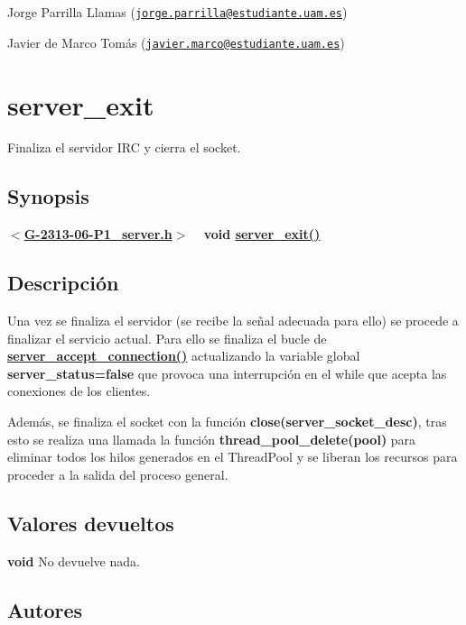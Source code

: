 \begin{DoxyItemize}
\item Jorge Parrilla Llamas (\href{mailto:jorge.parrilla@estudiante.uam.es}{\tt jorge.\+parrilla@estudiante.\+uam.\+es}) 
\item Javier de Marco Tomás (\href{mailto:javier.marco@estudiante.uam.es}{\tt javier.\+marco@estudiante.\+uam.\+es}) 
\end{DoxyItemize}\hypertarget{server_exit}{}\section{server\+\_\+exit}\label{server_exit}
Finaliza el servidor I\+R\+C y cierra el socket.\hypertarget{server_exit_synopsis6}{}\subsection{Synopsis}\label{server_exit_synopsis6}
{ {\bfseries $<$\hyperlink{G-2313-06-P1__server_8h}{G-\/2313-\/06-\/\+P1\+\_\+server.\+h}$>$} ~\newline
 {\bfseries void \hyperlink{G-2313-06-P1__server_8c_a0e947005d451a8f3bf3af01f54b59f11}{server\+\_\+exit()}} } \hypertarget{server_exit_descripcion6}{}\subsection{Descripción}\label{server_exit_descripcion6}
Una vez se finaliza el servidor (se recibe la señal adecuada para ello) se procede a finalizar el servicio actual. Para ello se finaliza el bucle de {\bfseries \hyperlink{G-2313-06-P1__server_8c_aaac8642d2e699e0f9d942d28a9b233c2}{server\+\_\+accept\+\_\+connection()}} actualizando la variable global {\bfseries server\+\_\+status=false} que provoca una interrupción en el while que acepta las conexiones de los clientes.

Además, se finaliza el socket con la función {\bfseries close(server\+\_\+socket\+\_\+desc)}, tras esto se realiza una llamada la función {\bfseries thread\+\_\+pool\+\_\+delete(pool)} para eliminar todos los hilos generados en el Thread\+Pool y se liberan los recursos para proceder a la salida del proceso general.\hypertarget{server_exit_return6}{}\subsection{Valores devueltos}\label{server_exit_return6}

\begin{DoxyItemize}
\item {\bfseries void} No devuelve nada. 
\end{DoxyItemize}\hypertarget{server_exit_authors6}{}\subsection{Autores}\label{server_exit_authors6}

